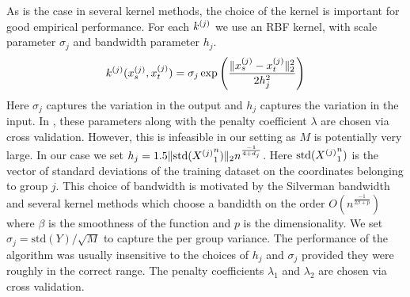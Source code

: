 As is the case in several kernel methods, the choice
of the kernel is important for good empirical performance.
For each $k^{(j)}$ we use an RBF kernel, with scale parameter $\sigma_j$
and bandwidth parameter $h_j$.
\[
k^{(j)}(x^{(j)}_s, x^{(j)}_t) = \sigma_j \exp \left( \frac{\|x^{(j)}_s -x^{(j)}_t\|_2^2 } 
  {2h_j^2} \right)
\]
Here $\sigma_j$ captures the variation in the output and $h_j$ captures the
variation in the input.
In \krr, these parameters along with the penalty coefficient $\lambda$ are
chosen via cross validation.
However, this is infeasible in our setting as $M$ is potentially very large. 
In our case we set $h_j = 1.5 \| \textrm{std}({X^{(j)}}_1^n) \|_2 n^{\frac{-1}{4+d_j}}$.
Here $\textrm{std}({X^{(j)}}_1^n)$ is the vector of standard deviations of the training
dataset on the coordinates belonging to group $j$. This choice of bandwidth is
motivated by the Silverman bandwidth and several kernel methods which choose 
a bandidth on the order $O(n^{\frac{-1}{2\beta+p}})$  where $\beta$ is the
smoothness of the function \cite{tsybakov08nonparametric} and $p$ is the
dimensionality. 
We set $\sigma_j = \textrm{std}(Y) / \sqrt{M}$ to capture the per group variance.
The performance of the algorithm was usually insensitive to the choices of $h_j$
and $\sigma_j$ provided they were roughly in the correct range.
The penalty coefficients $\lambda_1$ and $\lambda_2$ are chosen via cross
validation.


